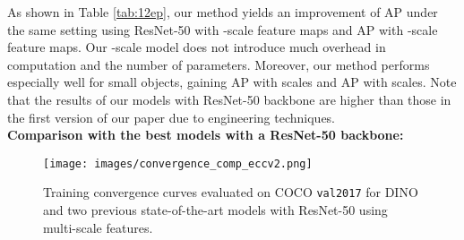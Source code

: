 \documentclass[runningheads]{llncs}
\begin{document}
As shown in Table \ref{tab:12ep}, our method yields an improvement of  AP under the same setting using ResNet-50 with -scale feature maps and  AP with -scale feature maps. Our -scale model does not introduce much overhead in computation and the number of parameters. Moreover, our method performs especially well for small objects, gaining  AP with  scales and  AP with  scales. Note that the results of our models with ResNet-50 backbone are higher than those in the first version of our paper due to engineering techniques.
\\
\noindent
\textbf{Comparison with the best models with a ResNet-50 backbone:}
\begin{table}[h]
\centering
{}
    \centering
    \vspace{0.2cm}
    \caption{Results for DINO and other detection models with the ResNet-50 backbone on COCO \texttt{val2017} trained with more epochs (, , or more). 
}
    
    \label{tab:50ep}
\end{table} \begin{figure}[h]
\centering
\texttt{[image: images/convergence\_comp\_eccv2.png]}
\caption{Training convergence curves evaluated on COCO \texttt{val2017} for DINO and two previous state-of-the-art models with ResNet-50 using multi-scale features.}
\label{fig:convergence_details}
    \vspace{0.1cm}
\end{figure}
\end{document}
